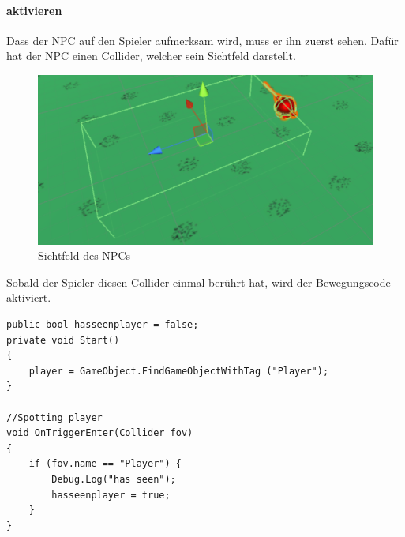 \paragraph{aktivieren}
Dass der NPC auf den Spieler aufmerksam wird, muss er ihn zuerst sehen.
Dafür hat der NPC einen Collider, welcher sein Sichtfeld darstellt.
\begin{figure}[H]
\includegraphics[scale=1]{screenshots/fov.png}
\caption{Sichtfeld des NPCs}
\end{figure}
Sobald der Spieler diesen Collider einmal berührt hat, wird der Bewegungscode aktiviert.
\begin{lstlisting}
public bool hasseenplayer = false;
private void Start()
{
	player = GameObject.FindGameObjectWithTag ("Player");
}
	
//Spotting player
void OnTriggerEnter(Collider fov)
{	
	if (fov.name == "Player") {
		Debug.Log("has seen");
		hasseenplayer = true;
	}
}
\end{lstlisting}
